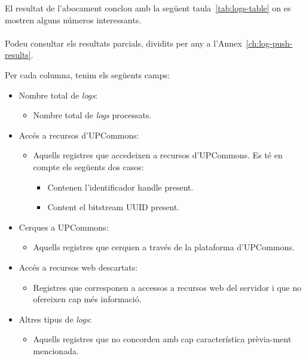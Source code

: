 \noindent
El resultat de l’abocament conclou amb la següent taula~\ref{tab:logs-table} on es mostren alguns números interessants. \\ \\
Podeu consultar els resultats parcials, dividits per any a l'Annex~\ref{ch:log-push-results}. \\



\clearpage

\noindent
Per cada columna, tenim els següents camps:

\begin{itemize}
    \item Nombre total de \textit{\gls{log}s}:
    \begin{itemize}
        \item Nombre total de \textit{logs} processats.
    \end{itemize}
    \item Accés a recursos d'\gls{UPCommons}:
    \begin{itemize}
        \item Aquells registres que accedeixen a recursos d’UPCommons. 
        Es té en compte els següents dos casos:
        \begin{itemize}
            \item Contenen l’identificador \gls{handle} present.
            \item Content el \gls{bitstream} \gls{UUID} present.
        \end{itemize}
    \end{itemize}
    \item Cerques a \gls{UPCommons}:
    \begin{itemize}
        \item Aquells registres que cerquen a través de la plataforma d’\gls{UPCommons}.
    \end{itemize}
    \item Accés a recursos web descartats:
    \begin{itemize}
        \item Registres que corresponen a accessos a recursos web del servidor i que no ofereixen cap més informació.
    \end{itemize}
    \item Altres tipus de \textit{logs}:
    \begin{itemize}
        \item Aquells registres que no concorden amb cap característica prèvia-ment mencionada.

\end{itemize}
\end{itemize}
